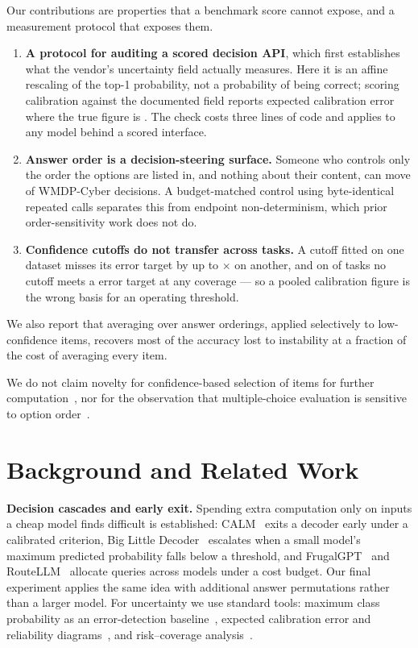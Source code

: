 \documentclass[conference]{IEEEtran}
\begin{document}
\noindent Our contributions are properties that a benchmark score cannot expose, and a
measurement protocol that exposes them.
\begin{enumerate}
\item \textbf{A protocol for auditing a scored decision API}, which first establishes what
      the vendor's uncertainty field actually measures. Here it is an affine rescaling of
      the top-1 probability, not a probability of being correct; scoring calibration
      against the documented field reports \statEceConf{} expected calibration error where
      the true figure is \statEcePmax{}. The check costs three lines of code and applies to
      any model behind a scored interface.
\item \textbf{Answer order is a decision-steering surface.} Someone who controls only the
      order the options are listed in, and nothing about their content, can move
      \statAtkSteerRotCyber{} of WMDP-Cyber decisions. A budget-matched control using
      byte-identical repeated calls separates this from endpoint non-determinism, which
      prior order-sensitivity work does not do.
\item \textbf{Confidence cutoffs do not transfer across tasks.} A cutoff fitted on one
      dataset misses its error target by up to \statThrBioWorstRatio{}$\times$ on another,
      and on \statThrNUnachievable{} of \statThrNDatasets{} tasks no cutoff meets a
      \statThrTarget{} error target at any coverage --- so a pooled calibration figure is
      the wrong basis for an operating threshold.
\end{enumerate}
\noindent We also report that averaging over answer orderings, applied selectively to
low-confidence items, recovers most of the accuracy lost to instability at a fraction of
the cost of averaging every item.

We do not claim novelty for confidence-based selection of items for further
computation~\cite{calm,bild,frugalgpt,routellm}, nor for the observation that
multiple-choice evaluation is sensitive to option order~\cite{alzahrani,gupta}.

\section{Background and Related Work}

\textbf{Decision cascades and early exit.} Spending extra computation only on inputs a
cheap model finds difficult is established: CALM~\cite{calm} exits a decoder early under a
calibrated criterion, Big Little Decoder~\cite{bild} escalates when a small model's maximum
predicted probability falls below a threshold, and FrugalGPT~\cite{frugalgpt} and
RouteLLM~\cite{routellm} allocate queries across models under a cost budget. Our final
experiment applies the same idea with additional answer permutations rather than a larger
model. For uncertainty we use standard tools: maximum class probability as an
error-detection baseline~\cite{hendrycks}, expected calibration error and reliability
diagrams~\cite{guo}, and risk--coverage analysis~\cite{geifman}.
\end{document}
